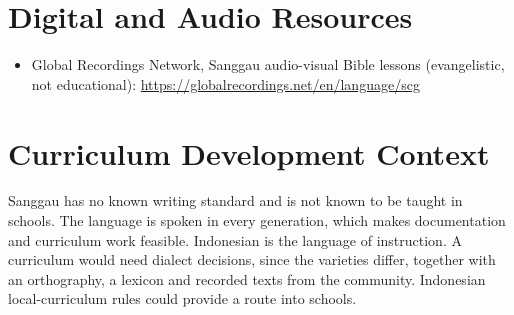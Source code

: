 \documentclass[12pt]{article}
\begin{document}
\section{Digital and Audio Resources}
\begin{itemize}
\item Global Recordings Network, Sanggau audio-visual Bible lessons (evangelistic, not educational): \url{https://globalrecordings.net/en/language/scg}
\end{itemize}

\section{Curriculum Development Context}
Sanggau has no known writing standard and is not known to be taught in schools. The language is spoken in every generation, which makes documentation and curriculum work feasible. Indonesian is the language of instruction. A curriculum would need dialect decisions, since the varieties differ, together with an orthography, a lexicon and recorded texts from the community. Indonesian local-curriculum rules could provide a route into schools.
\end{document}
